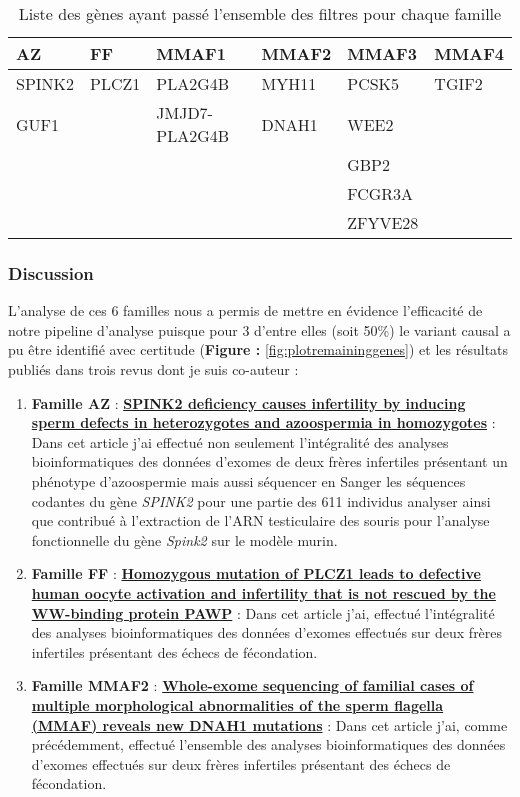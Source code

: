 \documentclass[12pt,twoside]{reedthesis}
\providecommand{\tightlist}{%
  \setlength{\itemsep}{0pt}\setlength{\parskip}{0pt}}
\theoremstyle{definition}
\theoremstyle{definition}
\theoremstyle{remark}
\begin{document}
  \newpage
  
  \begin{longtable}[t]{llllll}
  \caption{\label{tab:tablegene}Liste des gènes ayant passé l'ensemble des filtres pour chaque famille}\\
  \toprule
  AZ & FF & MMAF1 & MMAF2 & MMAF3 & MMAF4\\
  \midrule
  SPINK2 & PLCZ1 & PLA2G4B & MYH11 & PCSK5 & TGIF2\\
  GUF1 &  & JMJD7-PLA2G4B & DNAH1 & WEE2 & \\
   &  &  &  & GBP2 & \\
   &  &  &  & FCGR3A & \\
   &  &  &  & ZFYVE28 & \\
  \bottomrule
  \end{longtable}
  
  \subsubsection{Discussion}\label{discussion}
  
  L'analyse de ces 6 familles nous a permis de mettre en évidence
  l'efficacité de notre pipeline d'analyse puisque pour 3 d'entre elles
  (soit 50\%) le variant causal a pu être identifié avec certitude
  (\textbf{Figure : }\ref{fig:plotremaininggenes}) et les résultats
  publiés dans trois revus dont je suis co-auteur :
  
  \begin{enumerate}
  \def\labelenumi{\arabic{enumi}.}
  \tightlist
  \item
    \textbf{Famille AZ} : \protect\hyperlink{spink2}{\textbf{SPINK2
    deficiency causes infertility by inducing sperm defects in
    heterozygotes and azoospermia in homozygotes}} : Dans cet article j'ai
    effectué non seulement l'intégralité des analyses bioinformatiques des
    données d'exomes de deux frères infertiles présentant un phénotype
    d'azoospermie mais aussi séquencer en Sanger les séquences codantes du
    gène \emph{SPINK2} pour une partie des 611 individus analyser ainsi
    que contribué à l'extraction de l'ARN testiculaire des souris pour
    l'analyse fonctionnelle du gène \emph{Spink2} sur le modèle murin.\\
  \item
    \textbf{Famille FF} : \protect\hyperlink{plcz}{\textbf{Homozygous
    mutation of PLCZ1 leads to defective human oocyte activation and
    infertility that is not rescued by the WW-binding protein PAWP}} :
    Dans cet article j'ai, effectué l'intégralité des analyses
    bioinformatiques des données d'exomes effectués sur deux frères
    infertiles présentant des échecs de fécondation.\\
  \item
    \textbf{Famille MMAF2} :
    \protect\hyperlink{famdnah1}{\textbf{Whole-exome sequencing of
    familial cases of multiple morphological abnormalities of the sperm
    flagella (MMAF) reveals new DNAH1 mutations}} : Dans cet article j'ai,
    comme précédemment, effectué l'ensemble des analyses bioinformatiques
    des données d'exomes effectués sur deux frères infertiles présentant
    des échecs de fécondation.
  \end{enumerate}
  
\end{document}
